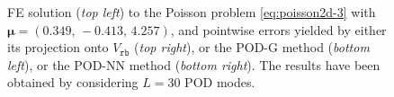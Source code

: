 \documentclass[12pt, a4paper, twoside, openright, notitlepage]{report}
\numberwithin{equation}{chapter}
\theoremstyle{theorem}
\theoremstyle{definition}
\theoremstyle{remark}
\theoremstyle{proposition}
\numberwithin{figure}{chapter}
\newcommand{\bg}[1]{\boldsymbol{#1}}
\begin{document}
\begin{figure}[H]
			
			
			\caption{FE solution (\emph{top left}) to the Poisson problem \eqref{eq:poisson2d-3} with $\bg{\mu} = (0.349, \, -0.413, \, 4.257)$, and pointwise errors yielded by either its projection onto $V_{\texttt{rb}}$ (\emph{top right}), or the POD-G method (\emph{bottom left}), or the POD-NN method (\emph{bottom right}). The results have been obtained by considering $L = 30$ POD modes.}
			\label{fig:poisson2d-3-fig1}
		\end{figure}	
		
\end{document}
